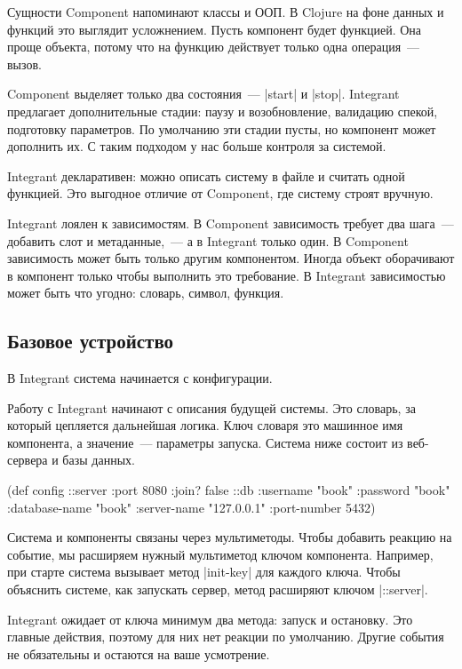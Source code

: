 Сущности Component напоминают классы и ООП. В Clojure на фоне данных и функций
это выглядит усложнением. Пусть компонент будет функцией. Она проще объекта,
потому что на функцию действует только одна операция~--- вызов.

Component выделяет только два состояния~--- \spverb|start| и
\spverb|stop|. Integrant предлагает дополнительные стадии: паузу и
возобновление, валидацию спекой, подготовку параметров. По умолчанию эти стадии
пусты, но компонент может дополнить их. С таким подходом у нас больше контроля
за системой.

Integrant декларативен: можно описать систему в файле и считать одной
функцией. Это выгодное отличие от Component, где систему строят вручную.

Integrant лоялен к зависимостям. В Component зависимость требует два шага~---
добавить слот и метаданные,~--- а в Integrant только один. В Component
зависимость может быть только другим компонентом. Иногда объект оборачивают в
компонент только чтобы выполнить это требование. В Integrant зависимостью может
быть что угодно: словарь, символ, функция.

\subsection{Базовое устройство}

В Integrant система начинается с конфигурации.

Работу с Integrant начинают с описания будущей системы. Это словарь, за который
цепляется дальнейшая логика. Ключ словаря это машинное имя компонента, а
значение~--- параметры запуска. Система ниже состоит из веб-сервера и базы
данных.

\begin{english}
  \begin{clojure}
(def config
  {::server {:port 8080 :join? false}
   ::db {:username      "book"
         :password      "book"
         :database-name "book"
         :server-name   "127.0.0.1"
         :port-number   5432}})
  \end{clojure}
\end{english}

Система и компоненты связаны через мультиметоды. Чтобы добавить реакцию на
событие, мы расширяем нужный мультиметод ключом компонента. Например, при старте
система вызывает метод \spverb|init-key| для каждого ключа. Чтобы объяснить
системе, как запускать сервер, метод расширяют ключом \spverb|::server|.

Integrant ожидает от ключа минимум два метода: запуск и остановку. Это главные
действия, поэтому для них нет реакции по умолчанию. Другие события не
обязательны и остаются на ваше усмотрение.

